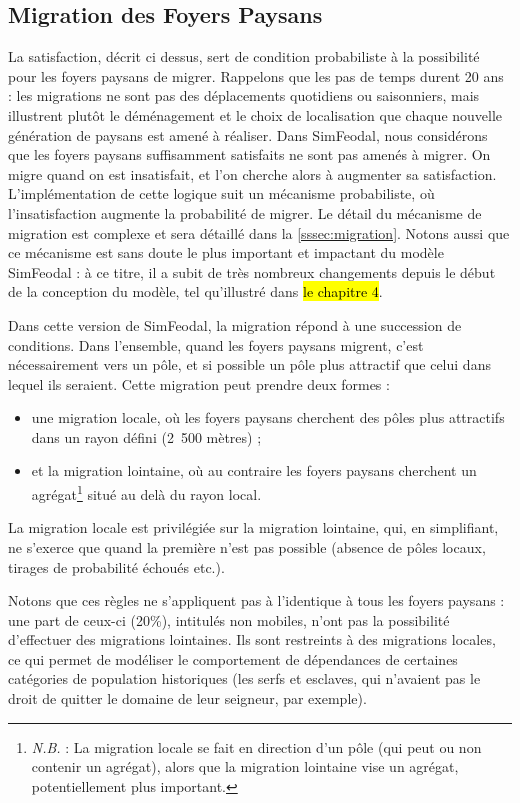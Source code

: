 \subsection{Migration des Foyers Paysans \label{meca-migration}}

La satisfaction, décrit ci dessus, sert de condition probabiliste à la possibilité pour les foyers paysans de migrer.
Rappelons que les pas de temps durent 20 ans : les migrations ne sont pas des déplacements quotidiens ou saisonniers, mais illustrent plutôt le déménagement et le choix de localisation que chaque nouvelle génération de paysans est amené à réaliser.
Dans SimFeodal, nous considérons que les foyers paysans suffisamment satisfaits ne sont pas amenés à migrer.
On migre quand on est insatisfait, et l'on cherche alors à augmenter sa satisfaction.
L'implémentation de cette logique suit un mécanisme probabiliste, où l'insatisfaction augmente la probabilité de migrer.
Le détail du mécanisme de migration est complexe et sera détaillé dans la \cref{sssec:migration}.
Notons aussi que ce mécanisme est sans doute le plus important et impactant du modèle SimFeodal : à ce titre, il a subit de très nombreux changements depuis le début de la conception du modèle, tel qu'illustré dans \hl{le chapitre 4}.

Dans cette version de SimFeodal, la migration répond à une succession de conditions.
Dans l'ensemble, quand les foyers paysans migrent, c'est nécessairement vers un pôle, et si possible un pôle plus attractif que celui dans lequel ils seraient.
Cette migration peut prendre deux formes :
\begin{itemize}
	\item une migration \og locale\fg{}, où les foyers paysans cherchent des pôles plus attractifs dans un rayon défini (2~500 mètres) ;
	\item et la migration \og lointaine\fg{}, où au contraire les foyers paysans cherchent un agrégat\footnote{
		\textit{N.B.} : La migration locale se fait en direction d'un pôle (qui peut ou non contenir un agrégat), alors que la migration lointaine vise un agrégat, potentiellement plus important.
	} situé au delà du rayon local.
\end{itemize} 
La migration locale est privilégiée sur la migration lointaine, qui, en simplifiant, ne s'exerce que quand la première n'est pas possible (absence de pôles locaux, tirages de probabilité échoués etc.).

Notons que ces règles ne s'appliquent pas à l'identique à tous les foyers paysans : une part de ceux-ci (20\%), intitulés \og non mobiles\fg{}, n'ont pas la possibilité d'effectuer des migrations lointaines.
Ils sont restreints à des migrations locales, ce qui permet de modéliser le comportement de dépendances de certaines catégories de population historiques (les serfs et esclaves, qui n'avaient pas le droit de quitter le domaine de leur seigneur, par exemple).


